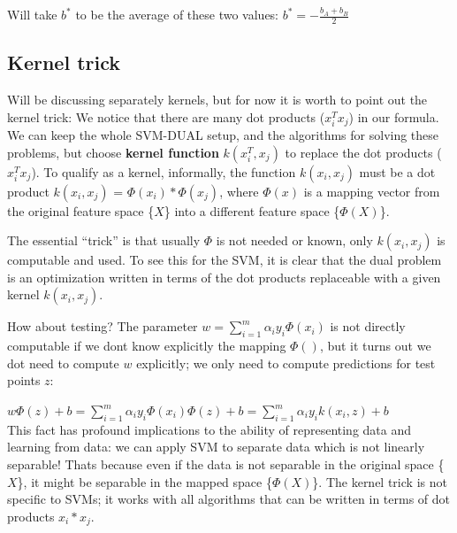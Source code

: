 \documentclass[a4paper]{article}
\begin{document}
Will take $b^\ast$ to be the average of these two values: $b^\ast = - \frac{b_A + b_B} {2}$



\subsection{Kernel trick}
Will be discussing separately kernels, but for now it is worth to point out the kernel trick: We notice that there are many dot products ($x_i^T x_j$) in our formula. We can keep the whole SVM-DUAL setup, and the algorithms for solving these problems, but choose \textbf{kernel function} $k(x_i^T, x_j)$ to replace the dot products ($x_i^T x_j$). To qualify as a kernel, informally, the function $k(x_i,x_j)$ must be a dot product $k(x_i,x_j)$ = $\Phi(x_i)* \Phi(x_j)$, where $\Phi(x)$ is a mapping vector from the original feature space \{$X$\} into a different feature space \{$\Phi(X)$\}.  

The essential ``trick'' is that usually $\Phi$ is not needed or known, only $k(x_i,x_j)$ is computable and used. To see this for the SVM, it is clear that the dual problem is an optimization written in terms of the dot products replaceable with a given kernel $k(x_i,x_j)$. 

How about testing? The parameter  $w = \sum_{i=1}^{m}\alpha_i y_i \Phi(x_i)$ is not directly computable if we dont know explicitly the mapping $\Phi()$, but it turns out we dot need to compute $w$ explicitly; we only need to compute predictions for test points $z$:


 $w\Phi(z)+b = \sum_{i=1}^{m}\alpha_i y_i \Phi(x_i)\Phi(z)+b =\sum_{i=1}^{m}\alpha_i y_i k(x_i,z)+b$\\

This fact has profound implications to the ability of representing data and learning from data: we can apply SVM to separate data which is not linearly separable! Thats because even if the data is not separable in the original space \{$X$\}, it might be separable in the mapped space \{$\Phi(X)$\}. The kernel trick is not specific to SVMs; it works with all algorithms that can be written in terms of dot products $x_i*x_j$.



\end{document}
